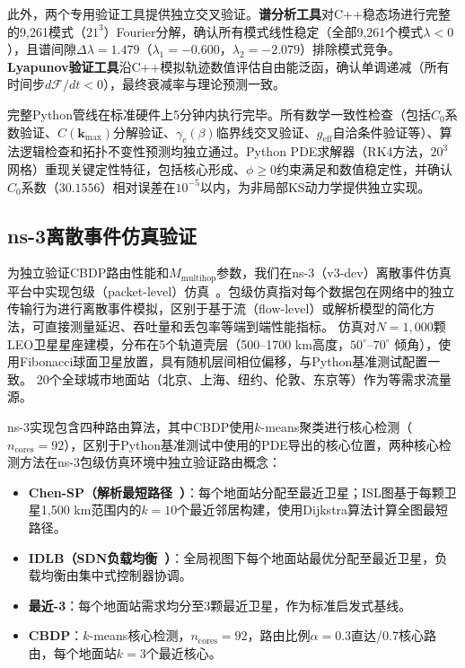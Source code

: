 \documentclass[sn-nature,pdflatex]{sn-jnl}
\begin{document}
此外，两个专用验证工具提供独立交叉验证。\textbf{谱分析工具}对C++稳态场进行完整的9,261模式（$21^3$）Fourier分解，确认所有模式线性稳定（全部9,261个模式$\lambda < 0$），且谱间隙$\Delta\lambda = 1.479$（$\lambda_1 = -0.600$，$\lambda_2 = -2.079$）排除模式竞争。\textbf{Lyapunov验证工具}沿C++模拟轨迹数值评估自由能泛函，确认单调递减（所有时间步$d\mathcal{F}/dt < 0$），最终衰减率与理论预测一致。

完整Python管线在标准硬件上5分钟内执行完毕。所有数学一致性检查（包括$C_0$系数验证、$C(\mathbf{k}_{\max})$分解验证、$\gamma_c(\beta)$临界线交叉验证、$g_{\text{eff}}$自洽条件验证等）、算法逻辑检查和拓扑不变性预测均独立通过。Python PDE求解器（RK4方法，$20^3$网格）重现关键定性特征，包括核心形成、$\phi \ge 0$约束满足和数值稳定性，并确认$C_0$系数（$30.1556$）相对误差在$10^{-5}$以内，为非局部KS动力学提供独立实现。

\subsection{ns-3离散事件仿真验证}

为独立验证CBDP路由性能和$M_{\text{multihop}}$参数，我们在ns-3（v3-dev）离散事件仿真平台中实现包级（packet-level）仿真~\cite{ns3_manual}。包级仿真指对每个数据包在网络中的独立传输行为进行离散事件模拟，区别于基于流（flow-level）或解析模型的简化方法，可直接测量延迟、吞吐量和丢包率等端到端性能指标。
仿真对$N=1,000$颗LEO卫星星座建模，分布在5个轨道壳层（500--1700 km高度，$50^\circ$--$70^\circ$ 倾角），使用Fibonacci球面卫星放置，具有随机层间相位偏移，与Python基准测试配置一致。
20个全球城市地面站（北京、上海、纽约、伦敦、东京等）作为等需求流量源。

ns-3实现包含四种路由算法，其中CBDP使用$k$-means聚类进行核心检测（$n_{\text{cores}}=92$），区别于Python基准测试中使用的PDE导出的核心位置，两种核心检测方法在ns-3包级仿真环境中独立验证路由概念：
\begin{itemize}
  \item \textbf{Chen-SP（解析最短路径~\cite{chen_2024_jsac}）}：每个地面站分配至最近卫星；ISL图基于每颗卫星1,500 km范围内的$k=10$个最近邻居构建，使用Dijkstra算法计算全图最短路径。
  \item \textbf{IDLB（SDN负载均衡~\cite{roth_2025_idlb}）}：全局视图下每个地面站最优分配至最近卫星，负载均衡由集中式控制器协调。
  \item \textbf{最近-3}：每个地面站需求均分至3颗最近卫星，作为标准启发式基线。
  \item \textbf{CBDP}：$k$-means核心检测，$n_{\text{cores}}=92$，路由比例$\alpha=0.3$直达/$0.7$核心路由，每个地面站$k=3$个最近核心。
\end{itemize}
\end{document}

